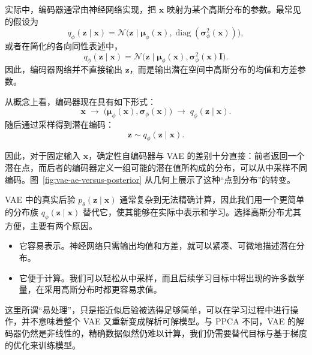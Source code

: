 实际中，编码器通常由神经网络实现，把 \(\mathbf{x}\) 映射为某个高斯分布的参数。最常见的假设为
\[
q_{\phi}(\mathbf{z}\mid\mathbf{x})
=
\mathcal{N}\!\bigl(
\mathbf{z}\mid
\boldsymbol{\mu}_{\phi}(\mathbf{x}),
\operatorname{diag}(\boldsymbol{\sigma}_{\phi}^2(\mathbf{x}))
\bigr),
\]
或者在简化的各向同性表述中，
\[
q_{\phi}(\mathbf{z}\mid\mathbf{x})
=
\mathcal{N}\!\bigl(
\mathbf{z}\mid
\boldsymbol{\mu}_{\phi}(\mathbf{x}),
\boldsymbol{\sigma}_{\phi}^2(\mathbf{x})\mathbf{I}
\bigr).
\]
因此，编码器网络并不直接输出 \(\mathbf{z}\)，而是输出潜在空间中高斯分布的均值和方差参数。

从概念上看，编码器现在具有如下形式：
\[
\mathbf{x}
\;\longrightarrow\;
\bigl(\boldsymbol{\mu}_{\phi}(\mathbf{x}),
\boldsymbol{\sigma}_{\phi}(\mathbf{x})\bigr)
\;\longrightarrow\;
q_{\phi}(\mathbf{z}\mid\mathbf{x}).
\]
随后通过采样得到潜在编码：
\[
\mathbf{z}\sim q_{\phi}(\mathbf{z}\mid\mathbf{x}).
\]

因此，对于固定输入 \(\mathbf{x}\)，确定性自编码器与 VAE 的差别十分直接：前者返回一个潜在点，而后者的编码器定义一组可能的潜在值所构成的分布，可以从中采样不同编码。图~\ref{fig:vae-ae-versus-posterior} 从几何上展示了这种“点到分布”的转变。



\begin{tcolorbox}[
  colback=blue!6,
  colframe=blue!55!black,
  title={为什么选择易处理的高斯近似后验？},
  boxrule=0.8pt,
  arc=2mm,
  left=2mm,
  right=2mm,
  top=1mm,
  bottom=1mm
]

VAE 中的真实后验 \(p_{\theta}(\mathbf{z}\mid\mathbf{x})\) 通常复杂到无法精确计算，因此我们用一个更简单的分布族 \(q_{\phi}(\mathbf{z}\mid\mathbf{x})\) 替代它，使其能够在实际中表示和学习。选择高斯分布尤其方便，主要有两个原因。

\begin{itemize}
    \item 它容易表示。神经网络只需输出均值和方差，就可以紧凑、可微地描述潜在分布。
    \item 它便于计算。我们可以轻松从中采样，而且后续学习目标中将出现的许多数学量，在采用高斯分布时都更容易求值。
\end{itemize}
这里所谓“易处理”，只是指近似后验被选得足够简单，可以在学习过程中进行操作，并不意味着整个 VAE 又重新变成解析可解模型。与 PPCA 不同，VAE 的解码器仍然是非线性的，精确数据似然仍难以计算，我们仍需要替代目标与基于梯度的优化来训练模型。

\end{tcolorbox}

